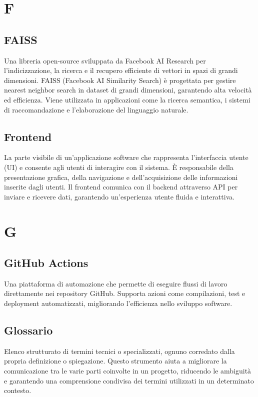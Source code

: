 \documentclass{article}
\begin{document}
\newpage
\section{F}

\subsection{FAISS}
Una libreria open-source sviluppata da Facebook AI Research per l'indicizzazione, la ricerca e il recupero efficiente di vettori in spazi di grandi dimensioni. FAISS (Facebook AI Similarity Search) è progettata per gestire nearest neighbor search in dataset di grandi dimensioni, garantendo alta velocità ed efficienza. Viene utilizzata in applicazioni come la ricerca semantica, i sistemi di raccomandazione e l'elaborazione del linguaggio naturale.

\subsection{Frontend}
La parte visibile di un'applicazione software che rappresenta l'interfaccia utente (UI) e consente agli utenti di interagire con il sistema. È responsabile della presentazione grafica, della navigazione e dell'acquisizione delle informazioni inserite dagli utenti. Il frontend comunica con il backend attraverso API per inviare e ricevere dati, garantendo un'esperienza utente fluida e interattiva.

\newpage
\section{G}

\subsection{GitHub Actions}
Una piattaforma di automazione che permette di eseguire flussi di lavoro direttamente nei repository GitHub. Supporta azioni come compilazioni, test e deployment automatizzati, migliorando l'efficienza nello sviluppo software.

\subsection{Glossario}
Elenco strutturato di termini tecnici o specializzati, ognuno corredato dalla propria definizione o spiegazione. Questo strumento aiuta a migliorare la comunicazione tra le varie parti coinvolte in un progetto, riducendo le ambiguità e garantendo una comprensione condivisa dei termini utilizzati in un determinato contesto.
\end{document}
